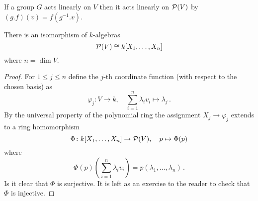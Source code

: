 \begin{rem}
  If a group $G$ acts linearly on $V$ then it acts linearly on $\mathcal{P}(V)$ by $(g.f)(v) = f\left(g^{-1}.v\right)$.
\end{rem}


\begin{lem}
  There is an isomorphism of $k$-algebras
  \[
          \mathcal{P}(V)
    \cong k[X_1, \dotsc, X_n]
  \]
  where $n = \dim V$.
\end{lem}
\begin{proof}
  For $1 \leq j \leq n$ define the $j$-th coordinate function (with respect to the chosen basis) as
  \[
            \varphi_j
    \colon  V \to k,
    \quad   \sum_{i=1}^n \lambda_i v_i
    \mapsto \lambda_j \,.
  \]
  By the universal property of the polynomial ring the assignment $X_j \to \varphi_j$ extends to a ring homomorphism
  \[
            \Phi
    \colon  k[X_1, \dotsc, X_n] \to \mathcal{P}(V),
    \quad   p
    \mapsto \Phi(p)
  \]
  where
  \[
      \Phi(p)\left( \sum_{i=1}^n \lambda_i v_i \right)
    = p(\lambda_1, \dotsc, \lambda_n) \,.
  \]
  Is it clear that $\Phi$ is surjective.
  It is left as an exercise to the reader to check that $\Phi$ is injective.
\end{proof}


